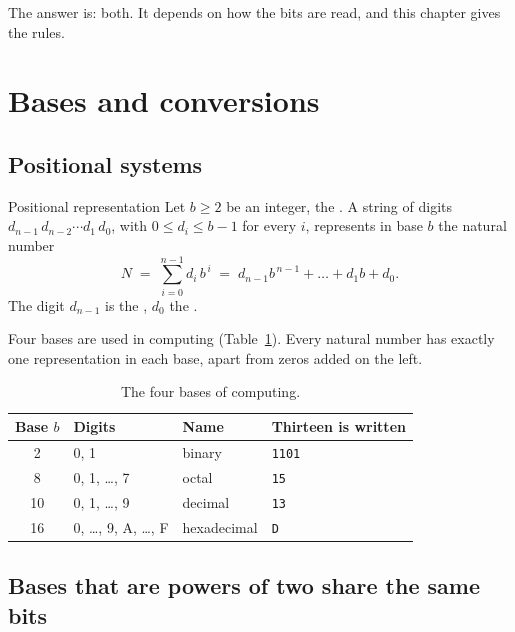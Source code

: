 The answer is: both. It depends on how the bits are read, and this chapter
gives the rules.

\section{Bases and conversions}

\subsection{Positional systems}

\begin{definition}{Positional representation}
Let $b\ge 2$ be an integer, the . A string of digits
$d_{n-1}\,d_{n-2}\cdots d_1\,d_0$, with $0\le d_i\le b-1$ for every $i$,
represents in base $b$ the natural number
\begin{equation}\label{eq:int:positional}
N \;=\; \sum_{i=0}^{n-1} d_i\, b^{\,i}
  \;=\; d_{n-1}b^{\,n-1}+\dots+d_1 b+d_0 .
\end{equation}
The digit $d_{n-1}$ is the , $d_0$ the .
\end{definition}

Four bases are used in computing (Table~\ref{tab:int:bases}). Every natural
number has exactly one representation in each base, apart from zeros added on
the left.

\begin{table}[htb]
\centering\small
\caption{The four bases of computing.}\label{tab:int:bases}
\begin{tabular}{@{}clll@{}}
\toprule
\textbf{Base $b$} & \textbf{Digits} & \textbf{Name} & \textbf{Thirteen is written}\\
\midrule
2 & 0, 1 & binary & \texttt{1101}\\
8 & 0, 1, \ldots, 7 & octal & \texttt{15}\\
10 & 0, 1, \ldots, 9 & decimal & \texttt{13}\\
16 & 0, \ldots, 9, A, \ldots, F & hexadecimal & \texttt{D}\\
\bottomrule
\end{tabular}
\end{table}

\subsection{Bases that are powers of two share the same bits}

